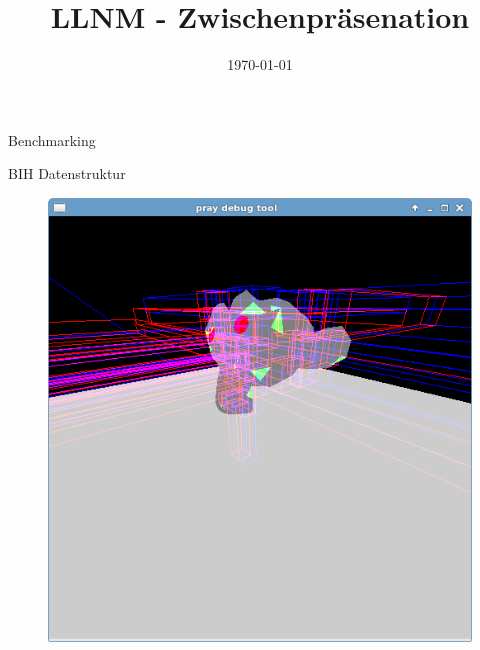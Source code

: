


\title[LLNM]{LLNM - Zwischenpräsenation}
\subtitle{}
\date{\today}

	\begin{frame}
		\titlepage
	\end{frame}
	\begin{frame}{Benchmarking}
		
	\end{frame}
	\begin{frame}{BIH Datenstruktur}
		\begin{figure}[ht]
		\includegraphics[height=0.8\textheight]{images/bih2.png}
		\end{figure}
	\end{frame}

